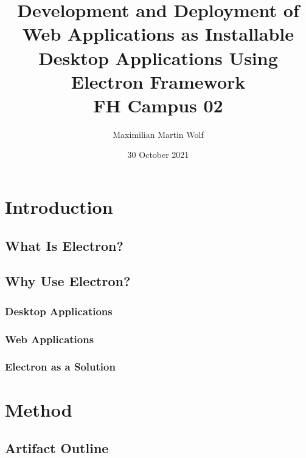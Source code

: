 \documentclass[11pt]{article}
\title{
        {Development and Deployment of Web Applications as Installable Desktop Applications Using
    Electron Framework}\\
    {\large FH Campus 02}\\
}
\author{Maximilian Martin Wolf}
\date{30 October 2021}
\begin{document}
    \maketitle
    \pagebreak
    \tableofcontents
    \pagebreak


    \section{Introduction}\label{sec:introduction}
    \setcounter{tocdepth}{3}

    \subsection{What Is Electron?}\label{subsec:what-is-electron}
    

    \subsection{Why Use Electron?}\label{subsec:why-use-electron}
    

    \subsubsection{Desktop Applications}\label{subsubsec:desktop-applications}
    

    \subsubsection{Web Applications}\label{subsubsec:web-applications}
    

    \subsubsection{Electron as a Solution}\label{subsubsec:electron-as-solution}
    

    \section{Method}\label{sec:method}
    

    \subsection{Artifact Outline}\label{subsubsec:dev-requirements}
    
    
\end{document}

